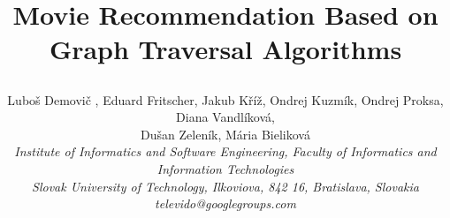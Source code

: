 \documentclass[10pt,slovak,a4paper]{article}
\begin{document}
\date{}

\title{ \begin{Large}
\textbf{Movie Recommendation Based on Graph Traversal Algorithms}
\end{Large}}
\maketitle
\begin{flushleft} 
\author{
\centering
Lubo\v{s} Demovi\v{c} , Eduard Fritscher, Jakub K\v{r}\'{i}\v{z}, Ondrej Kuzm\'{i}k, Ondrej Proksa, Diana Vandl\'{i}kov\'{a},\\ \centering Du\v{s}an Zelen\'{i}k, M\'{a}ria Bielikov\'{a}\\ \textit{ Institute of Informatics and Software Engineering, Faculty of Informatics and Information Technologies  \\ Slovak University of Technology, Ilkoviova, 842 16, Bratislava, Slovakia\\
televido@googlegroups.com
}

}\end{flushleft} 
\end{document}
